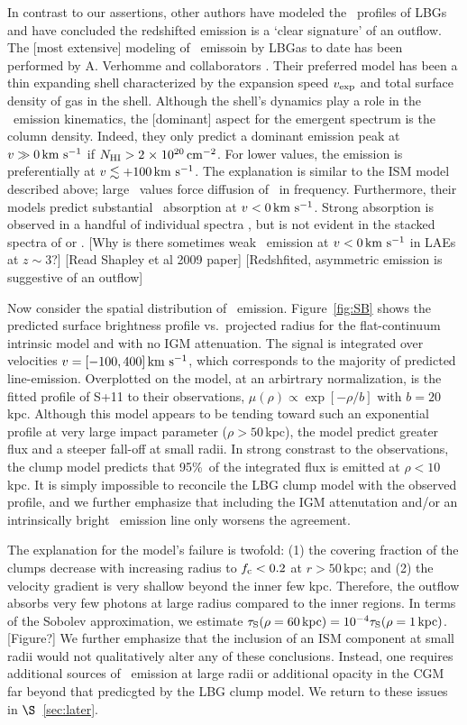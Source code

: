 \documentclass[12pt,preprint]{aastex}
\begin{document}
In contrast to our assertions,
other authors have modeled the \lya\ profiles of LBGs and have
concluded the redshifted emission is a `clear signature' of an
outflow.
The [most extensive] modeling of \lya\ emissoin by LBGas to date has
been performed by A. Verhomme and collaborators
\citep{verhommea,verhommeb}.  Their preferred model has been a thin
expanding shell characterized by the expansion speed $v_{\rm exp}$ and
total surface density of  gas in the shell.  Although the
shell's dynamics play a role in the \lya\ emission kinematics, the
[dominant] aspect for the emergent spectrum is the  column
density.  Indeed, they only predict a dominant emission peak at $v \gg
0 \, {\rm km~s^{-1}}$ if $N_{\rm HI} > 2{\; \times \; 10^{20}} \, {\rm cm^{-2}}$.  For lower values, the
emission is preferentially at $v \lesssim +100 \, {\rm km~s^{-1}}$.  The
explanation is similar to the ISM model described above;  large \nhi\
values force diffusion of \lya\ in frequency.  Furthermore, their
models predict substantial \lya\ absorption at $v < 0 \, {\rm km~s^{-1}}$.  
Strong absorption is observed in a handful of individual spectra
\citep[e.g.][]{cb58,dessauges}, but is not evident in the stacked
spectra of \cite{shapley93} or \cite{steidel+10}.  
[Why is there sometimes weak \lya\ emission at $v < 0 \, {\rm km~s^{-1}}$ in LAEs
at $z \sim 3$?]
[Read Shapley et al 2009 paper]
[Redshfited, asymmetric emission is suggestive of an outflow]


Now consider the spatial distribution of \lya\ emission.
Figure~\ref{fig:SB} shows the predicted surface brightness profile
vs.\ projected radius for the flat-continuum intrinsic model and with
no IGM attenuation.  The signal is integrated over velocities $v =
[-100,400]\, {\rm km~s^{-1}}$, which corresponds to the majority of predicted line-emission.
Overplotted on the model, at an arbirtrary
normalization, is the fitted profile of S+11 to their observations,
$\mu(\rho) \propto \exp[-\rho/b]$ with $b=20$\,kpc.  
Although this model appears to be tending toward such an exponential
profile at very large impact parameter ($\rho > 50$\,kpc), the model
predict greater flux and a steeper fall-off at small radii.
In strong constrast to
the observations, the clump model predicts that 95\%\ of the
integrated flux is emitted at $\rho < 10$\,kpc.  
It is simply impossible to reconcile the LBG clump model with the
observed profile, and we further emphasize that including the IGM
attenutation and/or an intrinsically bright \lya\ emission line only
worsens the agreement.

The explanation for the model's failure is twofold:  
(1) the covering fraction of the clumps decrease with increasing radius to
$f_{\rm c} < 0.2$ at $r > 50$\,kpc; and
(2) the velocity gradient is very shallow beyond the inner few kpc. Therefore,
the outflow absorbs very few photons at large radius compared to the
inner regions.  In terms of the Sobolev approximation, we estimate
$\tau_{\rm S}(\rho = 60 \, {\rm kpc}) = 10^{-4} \tau_{\rm S}(\rho=1\, {\rm
  kpc})$.  [Figure?]
We further emphasize that the inclusion of an ISM
component at small radii would not qualitatively alter any of these conclusions.
Instead, one requires additional sources of \lya\ emission at large
radii or additional opacity in the CGM far beyond that predicgted by
the LBG clump model.  We return to these issues in
$\S$~\ref{sec:later}.
\end{document}
